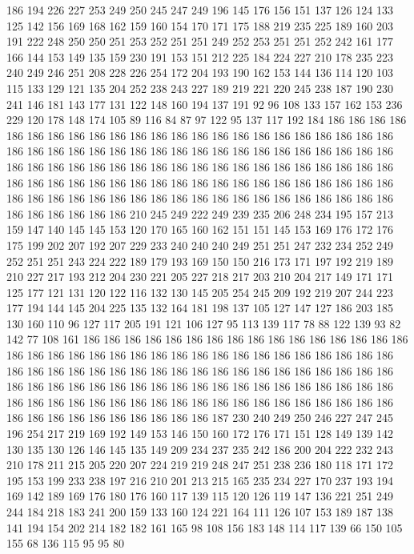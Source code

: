 186 194 226 227 253 249 250 245 247 249 196 145 176 156 151 137 126 124 133 125
142 156 169 168 162 159 160 154 170 171 175 188 219 235 225 189 160 203 191 222
248 250 250 251 253 252 251 251 249 252 253 251 251 252 242 161 177 166 144 153
149 135 159 230 191 153 151 212 225 184 224 227 210 178 235 223 240 249 246 251
208 228 226 254 172 204 193 190 162 153 144 136 114 120 103 115 133 129 121 135
204 252 238 243 227 189 219 221 220 245 238 187 190 230 241 146 181 143 177 131
122 148 160 194 137 191 92 96 108 133 157 162 153 236 229 120 178 148 174 105
89 116 84 87 97 122 95 137 117 192 184 186 186 186 186 186 186 186 186 186
186 186 186 186 186 186 186 186 186 186 186 186 186 186 186 186 186 186 186 186
186 186 186 186 186 186 186 186 186 186 186 186 186 186 186 186 186 186 186 186
186 186 186 186 186 186 186 186 186 186 186 186 186 186 186 186 186 186 186 186
186 186 186 186 186 186 186 186 186 186 186 186 186 186 186 186 186 186 186 186
186 186 186 186 186 186 186 186 186 186 186 186 186 186 186 186 210 245 249 222
249 239 235 206 248 234 195 157 213 159 147 140 145 145 153 120 170 165 160 162
151 151 145 153 169 176 172 176 175 199 202 207 192 207 229 233 240 240 240 249
251 251 247 232 234 252 249 252 251 251 243 224 222 189 179 193 169 150 150 216
173 171 197 192 219 189 210 227 217 193 212 204 230 221 205 227 218 217 203 210
204 217 149 171 171 125 177 121 131 120 122 116 132 130 145 205 254 245 209 192
219 207 244 223 177 194 144 145 204 225 135 132 164 181 198 137 105 127 147 127
186 203 185 130 160 110 96 127 117 205 191 121 106 127 95 113 139 117 78 88
122 139 93 82 142 77 108 161 186 186 186 186 186 186 186 186 186 186 186 186
186 186 186 186 186 186 186 186 186 186 186 186 186 186 186 186 186 186 186 186
186 186 186 186 186 186 186 186 186 186 186 186 186 186 186 186 186 186 186 186
186 186 186 186 186 186 186 186 186 186 186 186 186 186 186 186 186 186 186 186
186 186 186 186 186 186 186 186 186 186 186 186 186 186 186 186 186 186 186 186
186 186 186 186 186 186 186 186 186 186 187 230 240 249 250 246 227 247 245 196
254 217 219 169 192 149 153 146 150 160 172 176 171 151 128 149 139 142 130 135
130 126 146 145 135 149 209 234 237 235 242 186 200 204 222 232 243 210 178 211
215 205 220 207 224 219 219 248 247 251 238 236 180 118 171 172 195 153 199 233
238 197 216 210 201 213 215 165 235 234 227 170 237 193 194 169 142 189 169 176
180 176 160 117 139 115 120 126 119 147 136 221 251 249 244 184 218 183 241 200
159 133 160 124 221 164 111 126 107 153 189 187 138 141 194 154 202 214 182 182
161 165 98 108 156 183 148 114 117 139 66 150 105 155 68 136 115 95 95 80
